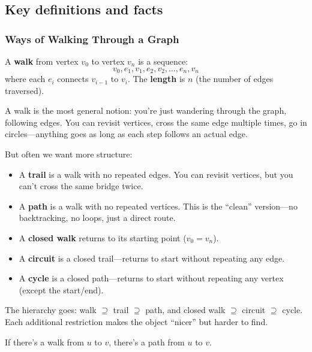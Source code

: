 \subsection*{Key definitions and facts}

\subsubsection*{Ways of Walking Through a Graph}

\begin{definition}[Walk]
A \textbf{walk} from vertex $v_0$ to vertex $v_n$ is a sequence:
\[
v_0, e_1, v_1, e_2, v_2, \ldots, e_n, v_n
\]
where each $e_i$ connects $v_{i-1}$ to $v_i$. The \textbf{length} is $n$ (the number of edges traversed).
\end{definition}

A walk is the most general notion: you're just wandering through the graph, following edges. You can revisit vertices, cross the same edge multiple times, go in circles---anything goes as long as each step follows an actual edge.

But often we want more structure:

\begin{definition}
\begin{itemize}
  \item A \textbf{trail} is a walk with no repeated edges. You can revisit vertices, but you can't cross the same bridge twice.
  \item A \textbf{path} is a walk with no repeated vertices. This is the ``clean'' version---no backtracking, no loops, just a direct route.
  \item A \textbf{closed walk} returns to its starting point ($v_0 = v_n$).
  \item A \textbf{circuit} is a closed trail---returns to start without repeating any edge.
  \item A \textbf{cycle} is a closed path---returns to start without repeating any vertex (except the start/end).
\end{itemize}
\end{definition}

The hierarchy goes: walk $\supseteq$ trail $\supseteq$ path, and closed walk $\supseteq$ circuit $\supseteq$ cycle. Each additional restriction makes the object ``nicer'' but harder to find.

\begin{proposition}
If there's a walk from $u$ to $v$, there's a path from $u$ to $v$.
\end{proposition}


